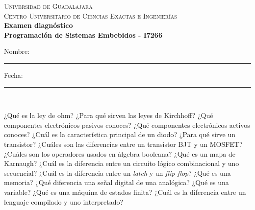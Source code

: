 \documentclass[10pt,letterpaper]{exam}
\begin{document}
\begin{center}
\textsc{\Large Universidad de Guadalajara}\\
\textsc{Centro Universitario de Ciencias Exactas e Ingenierías}\\
\vspace{6mm}
\textbf{Examen diagnóstico\\ Programación de Sistemas Embebidos - I7266}\\
\vspace{6mm}
{Nombre: \rule{0.7\textwidth}{0.4pt}} Fecha: \rule{0.15\textwidth}{0.4pt}\\
\vspace{6mm}
\end{center}
\begin{questions}
    \vspace{5mm}
    \question ¿Qué es la ley de ohm?
    \question ¿Para qué sirven las leyes de Kirchhoff?
    \question ¿Qué componentes electrónicos pasivos conoces?
    \question ¿Qué componentes electrónicos activos conoces?
    \question ¿Cuál es la característica principal de un diodo?
    \question ¿Para qué sirve un transistor?
    \question ¿Cuáles son las diferencias entre un transistor BJT y un MOSFET?
    \clearpage
    \question ¿Cuáles son los operadores usados en álgebra booleana?
    \question ¿Qué es un {mapa de Karnaugh}?
    \question ¿Cuál es la diferencia entre un circuito lógico combinacional y uno secuencial?
    \question ¿Cuál es la diferencia entre un \textit{latch} y un \textit{flip-flop}?
    \question ¿Qué es una memoria?
    \question ¿Qué diferencia una señal digital de una analógica?
    \question ¿Qué es una variable?
    \question ¿Qué es una máquina de estados finita?
    \question ¿Cuál es la diferencia entre un lenguaje compilado y uno interpretado?
\end{questions}
\thispagestyle{empty}
\end{document}
